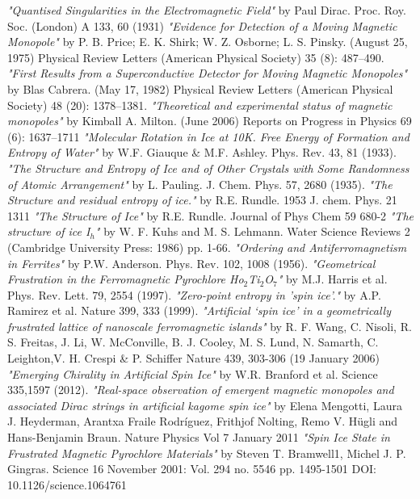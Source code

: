 \clearpage
{}
\begin{thebibliography}{99}
\emph{"Quantised Singularities in the Electromagnetic Field"} by  Paul Dirac. Proc. Roy. Soc. (London) A 133, 60 (1931)
\emph{"Evidence for Detection of a Moving Magnetic Monopole"} by P. B. Price; E. K. Shirk; W. Z. Osborne; L. S. Pinsky. (August 25, 1975) Physical Review Letters (American Physical Society) 35 (8): 487–490.
\emph{"First Results from a Superconductive Detector for Moving Magnetic Monopoles"} by  Blas Cabrera. (May 17, 1982) Physical Review Letters (American Physical Society) 48 (20): 1378–1381.
\emph{"Theoretical and experimental status of magnetic monopoles"} by Kimball A. Milton. (June 2006) Reports on Progress in Physics 69 (6): 1637–1711
\emph{"Molecular Rotation in Ice at 10K. Free Energy of Formation and Entropy of Water"} by W.F. Giauque \& M.F. Ashley. Phys. Rev. 43, 81 (1933).
\emph{"The Structure and Entropy of Ice and of Other Crystals with Some Randomness of Atomic Arrangement"} by L. Pauling.  J. Chem. Phys. 57, 2680 (1935).
\emph{"The Structure and residual entropy of ice."} by R.E. Rundle. 1953 J. chem. Phys. 21 1311
\emph{"The Structure of Ice"} by R.E. Rundle. Journal of Phys Chem 59 680-2
\emph{"The structure of ice I$_{h}$"} by W. F. Kuhs and M. S. Lehmann. Water Science Reviews 2 (Cambridge University Press: 1986) pp. 1-66.
\emph{"Ordering and Antiferromagnetism in Ferrites"} by P.W. Anderson. Phys. Rev. 102, 1008 (1956).
\emph{"Geometrical Frustration in the Ferromagnetic Pyrochlore Ho$_{2}$Ti$_{2}$O$_{7}$"} by M.J. Harris et al. Phys. Rev. Lett. 79, 2554 (1997).
\emph{"Zero-point entropy in 'spin ice'."} by A.P. Ramirez et al. Nature 399, 333 (1999).
\emph{"Artificial ‘spin ice’ in a geometrically frustrated lattice of nanoscale ferromagnetic islands"} by R. F. Wang, C. Nisoli, R. S. Freitas, J. Li, W. McConville, B. J. Cooley, M. S. Lund, N. Samarth, C. Leighton,V. H. Crespi \& P. Schiffer Nature 439, 303-306 (19 January 2006)
\emph{"Emerging Chirality in Artificial Spin Ice"} by  W.R. Branford et al. Science 335,1597 (2012).
\emph{"Real-space observation of emergent magnetic monopoles and associated Dirac strings in artificial kagome spin ice"} by Elena Mengotti, Laura J. Heyderman, Arantxa Fraile Rodríguez, Frithjof Nolting, Remo V. Hügli and Hans-Benjamin Braun. Nature Physics Vol 7 January 2011
\emph{"Spin Ice State in Frustrated Magnetic Pyrochlore Materials"} by Steven T. Bramwell1, Michel J. P. Gingras. Science 16 November 2001: Vol. 294 no. 5546 pp. 1495-1501 DOI: 10.1126/science.1064761
\end{thebibliography}
